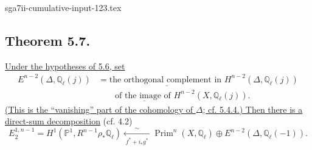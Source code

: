 \begin{filecontents*}{sga7ii-cumulative-input-123.tex}
\subsection*{Theorem 5.7.}
\underline{Under the hypotheses of 5.6, set}
\[
\begin{aligned}
E^{n-2}(\Delta,\mathbb Q_\ell(j))
&=\underline{\text{the orthogonal complement in }}
H^{n-2}(\Delta,\mathbb Q_\ell(j))\\
&\qquad\underline{\text{of the image of }}
H^{n-2}(X,\mathbb Q_\ell(j)).
\end{aligned}
\]
\underline{(This is the \textquotedblleft vanishing\textquotedblright{}
part of the cohomology of $\Delta$; cf. 5.4.4.)  Then there is a
direct-sum decomposition} (cf. 4.2)
\begin{equation}\tag{5.7.1}
E_2^{1,n-1}
=H^1(\mathbb P^1,R^{n-1}\rho_*\mathbb Q_\ell)
\xleftarrow[\;f^*+i_*g^*\;]{\sim}
\operatorname{Prim}^n(X,\mathbb Q_\ell)
\oplus E^{n-2}(\Delta,\mathbb Q_\ell(-1)).
\end{equation}


\end{filecontents*}
